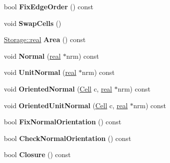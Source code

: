 \begin{DoxyCompactItemize}
\item 
\hypertarget{classINMOST_1_1Face_a7c197d0d9d1da8b39815ec8193470d55}{bool {\bfseries Fix\-Edge\-Order} () const }\label{classINMOST_1_1Face_a7c197d0d9d1da8b39815ec8193470d55}

\item 
\hypertarget{classINMOST_1_1Face_afc7145b4345851c8b63d4cb1fb3f7fb8}{void {\bfseries Swap\-Cells} ()}\label{classINMOST_1_1Face_afc7145b4345851c8b63d4cb1fb3f7fb8}

\item 
\hypertarget{classINMOST_1_1Face_ae64a118505766e645f81a608d1bca9b3}{\hyperlink{classINMOST_1_1Storage_a853346784b4a5822a7fac54d8f10f805}{Storage\-::real} {\bfseries Area} () const }\label{classINMOST_1_1Face_ae64a118505766e645f81a608d1bca9b3}

\item 
\hypertarget{classINMOST_1_1Face_a1d88c443096cda59520e89857b8338fa}{void {\bfseries Normal} (\hyperlink{classINMOST_1_1Storage_a853346784b4a5822a7fac54d8f10f805}{real} $\ast$nrm) const }\label{classINMOST_1_1Face_a1d88c443096cda59520e89857b8338fa}

\item 
\hypertarget{classINMOST_1_1Face_a1dd3d4570f8d22104b606094a5c1c983}{void {\bfseries Unit\-Normal} (\hyperlink{classINMOST_1_1Storage_a853346784b4a5822a7fac54d8f10f805}{real} $\ast$nrm) const }\label{classINMOST_1_1Face_a1dd3d4570f8d22104b606094a5c1c983}

\item 
\hypertarget{classINMOST_1_1Face_acc9ff2f465808c7da9b11fe2bfe05e68}{void {\bfseries Oriented\-Normal} (\hyperlink{classINMOST_1_1Cell}{Cell} c, \hyperlink{classINMOST_1_1Storage_a853346784b4a5822a7fac54d8f10f805}{real} $\ast$nrm) const }\label{classINMOST_1_1Face_acc9ff2f465808c7da9b11fe2bfe05e68}

\item 
\hypertarget{classINMOST_1_1Face_a2a624f1435b028243efc9ab1dbbb45d2}{void {\bfseries Oriented\-Unit\-Normal} (\hyperlink{classINMOST_1_1Cell}{Cell} c, \hyperlink{classINMOST_1_1Storage_a853346784b4a5822a7fac54d8f10f805}{real} $\ast$nrm) const }\label{classINMOST_1_1Face_a2a624f1435b028243efc9ab1dbbb45d2}

\item 
\hypertarget{classINMOST_1_1Face_a92e3c5875775427822426b6bc891a019}{bool {\bfseries Fix\-Normal\-Orientation} () const }\label{classINMOST_1_1Face_a92e3c5875775427822426b6bc891a019}

\item 
\hypertarget{classINMOST_1_1Face_a04e7a630eee6a9154c74254a7c08bac9}{bool {\bfseries Check\-Normal\-Orientation} () const }\label{classINMOST_1_1Face_a04e7a630eee6a9154c74254a7c08bac9}

\item 
\hypertarget{classINMOST_1_1Face_ab825faac44428f15c5fd03ffbe45df27}{bool {\bfseries Closure} () const }\label{classINMOST_1_1Face_ab825faac44428f15c5fd03ffbe45df27}

\end{DoxyCompactItemize}
